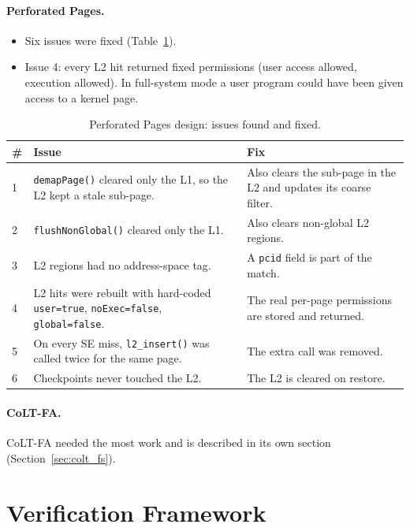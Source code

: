 \paragraph{Perforated Pages.}
\begin{itemize}
    \item Six issues were fixed (Table~\ref{tab:perf_bugs}).
    \item Issue 4: every L2 hit returned fixed permissions (user access allowed, execution allowed). In full-system mode a user program could have been given access to a kernel page.
\end{itemize}

\begin{table}[H]
\centering
\small
\caption{Perforated Pages design: issues found and fixed.}
\label{tab:perf_bugs}
\begin{tabularx}{\textwidth}{l X X}
\toprule
\textbf{\#} & \textbf{Issue} & \textbf{Fix} \\
\midrule
1 & \texttt{demapPage()} cleared only the L1, so the L2 kept a stale sub-page. & Also clears the sub-page in the L2 and updates its coarse filter. \\
2 & \texttt{flushNonGlobal()} cleared only the L1. & Also clears non-global L2 regions. \\
3 & L2 regions had no address-space tag. & A \texttt{pcid} field is part of the match. \\
4 & L2 hits were rebuilt with hard-coded \texttt{user=true}, \texttt{noExec=false}, \texttt{global=false}. & The real per-page permissions are stored and returned. \\
5 & On every SE miss, \texttt{l2\_insert()} was called twice for the same page. & The extra call was removed. \\
6 & Checkpoints never touched the L2. & The L2 is cleared on restore. \\
\bottomrule
\end{tabularx}
\end{table}

\paragraph{CoLT-FA.} CoLT-FA needed the most work and is described in its own section (Section~\ref{sec:colt_fs}).

\section{Verification Framework}
\label{sec:verif}

